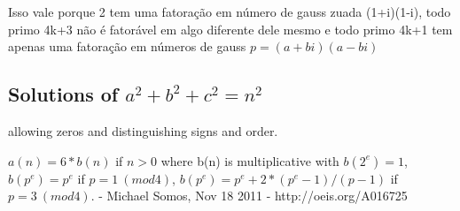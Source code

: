 \documentclass{article}
\begin{document}
Isso vale porque 2 tem uma fatoração em número de gauss zuada (1+i)(1-i), todo primo 4k+3 não é fatorável em algo diferente dele mesmo e todo primo 4k+1 tem apenas uma fatoração em números de gauss $p=(a+bi)(a-bi)$

\subsection{Solutions of $a^2+b^2+c^2 = n^2$}
allowing zeros and distinguishing signs and order.

$a(n) = 6 * b(n)$ if $n>0$ where b(n) is multiplicative with $b(2^e) = 1$, $b(p^e) = p^e$ if $p = 1 \ (mod 4)$, $b(p^e) = p^e + 2 * (p^e - 1) / (p - 1)$ if $p = 3 \  (mod 4)$. - Michael Somos, Nov 18 2011 - http://oeis.org/A016725
\end{document}
